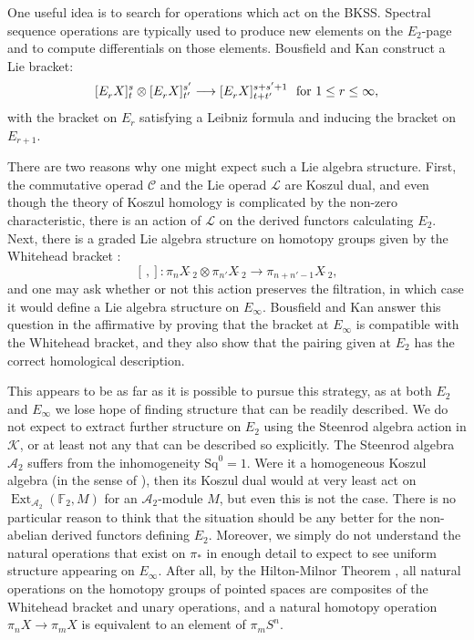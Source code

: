 \documentclass[11pt]{amsart} \renewcommand{\baselinestretch}{1.2}
\theoremstyle{plain}
\numberwithin{equation}{section} %
\theoremstyle{plain}
\numberwithin{equation}{chapter} %
\DeclareMathOperator{\Ext}{Ext}
\renewcommand{\to}{\longrightarrow}
\newcommand{\scrL}{\mathscr{L}}
\newcommand{\scrC}{\mathscr{C}}
\newcommand{\calK}{\mathcal{K}}
\newcommand{\cala}{\mathcal{A}}
\newcommand{\citeBOX}[2][]{\cite[\mbox{#1}]{#2}}
\newcommand{\LieOperad}{{\scrL}}
\newcommand{\CommOperad}{{\scrC}}
\newcommand{\Sq}{\mathrm{Sq}}
\newcommand{\F}{\mathbb{F}}
\newcommand{\Ftwo}{\F_2}
\newcommand{\E}[5]{[E^{#1}_{#2}#3]^{#4}_{#5}}
\newcommand{\BKSS}{BKSS}
\begin{document}
\begin{Introduction}
One useful idea is to search for operations which act on the \BKSS. Spectral sequence operations are typically used to produce new elements on the $E_2$-page and to compute differentials on those elements. Bousfield and Kan \cite[\S14]{BK_pairings_products.pdf} construct a Lie bracket:
\[\E{}{r}{X}{s}{t} \otimes \E{}{r}{X}{s'}{t'}\to \E{}{r}{X}{s+s'+1}{t+t'}\textup{ \ for $1\leq r\leq \infty$},\]
with the bracket on $E_r$ satisfying  a Leibniz formula and inducing the bracket on $E_{r+1}$.

There are two reasons why one might expect such a Lie algebra structure. %
First, the commutative operad $\CommOperad$ and the Lie operad $\LieOperad$ are Koszul dual, and even though the theory of Koszul homology is complicated by the non-zero characteristic, there is an action of $\LieOperad$ on the derived functors calculating $E_2$. %
Next, there is a graded Lie algebra structure on homotopy groups given by the Whitehead bracket \cite{MR0004123}:
\[[\,,]:\pi_nX\hat{\ }_{\!\!\!2}\otimes \pi_{n'}X\hat{\ }_{\!\!\!2}\to \pi_{n+n'-1}X\hat{\ }_{\!\!\!2},\]
and one may ask whether or not this action preserves the filtration, in which case it would define a Lie algebra structure on $E_\infty$.
Bousfield and Kan answer this question in the affirmative by proving that the bracket at $E_\infty$ is compatible with the Whitehead bracket, and they also show that the pairing given at $E_2$ has the correct homological description.

This appears to be as far as it is possible to pursue this strategy, as at both $E_2$ and $E_\infty$ we lose hope of finding structure that can be readily described. %
We do not expect to extract further structure on $E_2$ using the Steenrod algebra action in $\calK$, or at least not any that can be described so explicitly. The Steenrod algebra $\cala_2$ suffers from the inhomogeneity $\Sq^0=1$. Were it a homogeneous Koszul algebra (in the sense of \cite{PriddyKoszul.pdf}), then its Koszul dual would at very least act on $\Ext_{\cala_2}(\Ftwo,M)$ for an $\cala_2$-module $M$, but even this is not the case. 
There is no particular reason to think that the situation should be any better for the non-abelian derived functors defining $E_2$.
Moreover, we simply do not understand the natural operations that exist on $\pi_*$ in enough detail to expect to see uniform structure appearing on $E_\infty$. After all, by the Hilton-Milnor Theorem \citeBOX[\S4]{Neisendorfer.pdf}, all natural operations on the homotopy groups of pointed spaces are composites of the Whitehead bracket and unary operations, and a natural  homotopy operation $\pi_n X\to \pi_m X$ is equivalent to an element of $\pi_m S^n$.




\end{Introduction}
\end{document}

